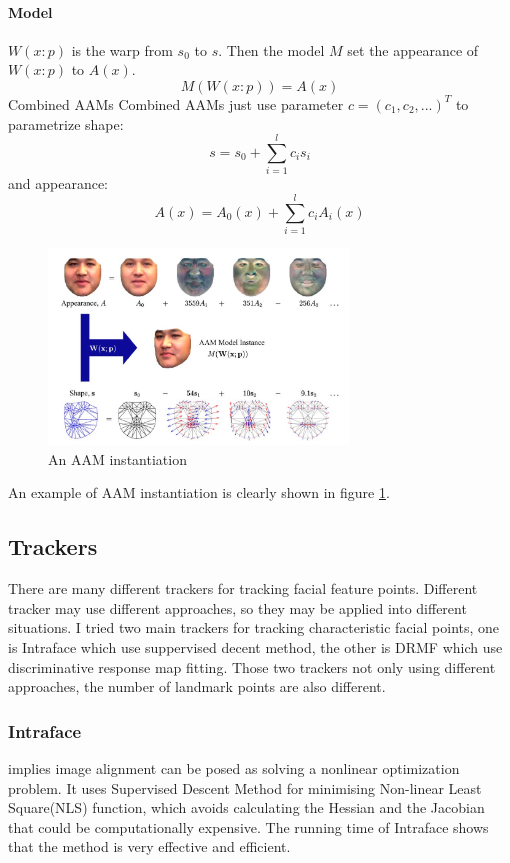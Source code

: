\paragraph{Model} 
$W(x:p)$ is the warp from $s_{0}$ to $s$. Then the model $M$ set the appearance of $W(x:p)$ to $A(x)$.
\begin{equation}
M(W(x:p)) = A(x)
\end{equation}
\newline
Combined AAMs
\newline
Combined AAMs just use parameter $c = (c_{1},c_{2},...)^{T}$ to parametrize shape:
\begin{equation}
s = s_{0} + \sum_{i=1}^{l}c_{i}s_{i}
\end{equation}
and appearance:
\begin{equation}
A(x) = A_{0}(x) + \sum_{i=1}^{l}c_{i}A_{i}(x)
\end{equation}
\begin{figure}[ht]
\centering
\includegraphics[width = 80mm]{imgs/AAM_Model.png}
\caption{An AAM instantiation}
\label{fig:AAMI}
\end{figure}
An example of AAM instantiation is clearly shown in figure \ref{fig:AAMI}.
\subsection{Trackers}
There are many different trackers for tracking facial feature points. Different tracker may use different approaches, so they may be applied into different situations. I tried two main trackers for tracking characteristic facial points, one is Intraface \cite{xiong2013supervised} which use suppervised decent method, the other is DRMF \cite{asthana2013robust} which use discriminative response map fitting. Those two trackers not only using different approaches, the number of landmark points are also different.
\subsubsection{Intraface}
\cite{xiong2013supervised} implies image alignment  can be posed as solving a nonlinear optimization problem. It uses Supervised Descent Method for minimising Non-linear Least Square(NLS) function, which avoids calculating the Hessian and the Jacobian that could be computationally expensive. The running time of Intraface shows that the method is very effective and efficient.
